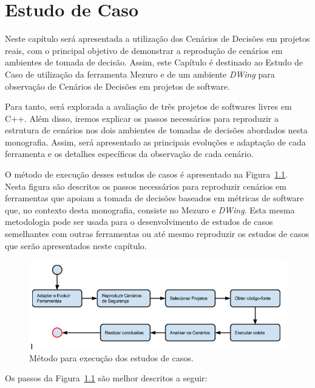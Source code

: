 \chapter{Estudo de Caso}
\label{cap-case-study}

%

Neste capítulo será apresentada a utilização dos Cenários de Decisões em projetos reais, com o principal objetivo de demonstrar a reprodução de cenários em ambientes de tomada de decisão. Assim, este Capítulo é destinado ao Estudo de Caso de utilização da ferramenta Mezuro e de um ambiente \emph{DWing} para observação de Cenários de Decisões em projetos de software.

Para tanto, será explorada a avaliação de três projetos de softwares livres em C++. Além disso, iremos explicar os passos necessários para reproduzir a estrutura de cenários nos dois ambientes de tomadas de decisões abordados nesta monografia. Assim, será apresentado as principais evoluções e adaptação de cada ferramenta e os detalhes específicos da observação de cada cenário.

O método de execução desses estudos de casos é apresentado na Figura~\ref{method}. Nesta figura são descritos os passos necessários para reproduzir cenários em ferramentas que apoiam a tomada de decisões baseados em métricas de software que, no contexto desta monografia, consiste no Mezuro e \emph{DWing}. Esta mesma metodologia pode ser usada para o desenvolvimento de estudos de casos semelhantes com outras ferramentas ou até mesmo reproduzir os estudos de casos que serão apresentados neste capítulo.

\graphicspath{{figuras/}}
\begin{figure}[h]
\centering
\includegraphics[width=1.0\textwidth]{fluxograma}
\caption{Método para execução dos estudos de casos.}
\label{method}
\end{figure}

Os passos da Figura~\ref{method} são melhor descritos a seguir:

